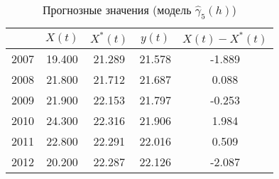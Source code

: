 \begin{table}[ht]
\centering
\caption{Прогнозные значения (модель $ \widehat{\gamma}_5(h) $)} 
\label{table:sph-fit-adapt-prediction}
\begin{tabular}{r|cccc}
  \hline
 & $X(t)$ & $X^{*}(t)$ & $y(t)$ & $ X(t) - X^{*}(t) $ \\ 
  \hline
2007 & 19.400 & 21.289 & 21.578 & -1.889 \\ 
  2008 & 21.800 & 21.712 & 21.687 & 0.088 \\ 
  2009 & 21.900 & 22.153 & 21.797 & -0.253 \\ 
  2010 & 24.300 & 22.316 & 21.906 & 1.984 \\ 
  2011 & 22.800 & 22.291 & 22.016 & 0.509 \\ 
  2012 & 20.200 & 22.287 & 22.126 & -2.087 \\ 
   \hline
\end{tabular}
\end{table}
